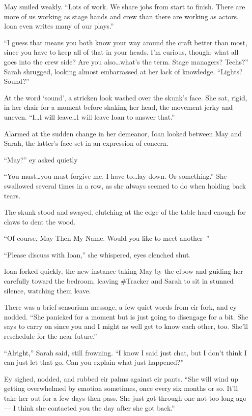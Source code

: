 May smiled weakly. ``Lots of work. We share jobs from start to finish. There are more of us working as stage hands and crew than there are working as actors. Ioan even writes many of our plays.''

``I guess that means you both know your way around the craft better than most, since you have to keep all of that in your heads. I'm curious, though; what all goes into the crew side? Are you also\ldots what's the term. Stage managers? Techs?'' Sarah shrugged, looking almost embarrassed at her lack of knowledge. ``Lights? Sound?''

At the word `sound', a stricken look washed over the skunk's face. She sat, rigid, in her chair for a moment before shaking her head, the movement jerky and uneven. ``I\ldots I will leave\ldots I will leave Ioan to answer that.''

Alarmed at the sudden change in her demeanor, Ioan looked between May and Sarah, the latter's face set in an expression of concern.

``May?'' ey asked quietly

``You must\ldots you must forgive me. I have to\ldots lay down. Or something.'' She swallowed several times in a row, as she always seemed to do when holding back tears.

The skunk stood and swayed, clutching at the edge of the table hard enough for claws to dent the wood.

``Of course, May Then My Name. Would you like to meet another--''

``Please discuss with Ioan,'' she whispered, eyes clenched shut.

Ioan forked quickly, the new instance taking May by the elbow and guiding her carefully toward the bedroom, leaving \#Tracker and Sarah to sit in stunned silence, watching them leave.

There was a brief sensorium message, a few quiet words from eir fork, and ey nodded. ``She panicked for a moment but is just going to disengage for a bit. She says to carry on since you and I might as well get to know each other, too. She'll reschedule for the near future.''

``Alright,'' Sarah said, still frowning. ``I know I said just chat, but I don't think I can just let that go. Can you explain what just happened?''

Ey sighed, nodded, and rubbed eir palms against eir pants. ``She will wind up getting overwhelmed by emotion sometimes, once every six months or so. It'll take her out for a few days then pass. She just got through one not too long ago — I think she contacted you the day after she got back.''

